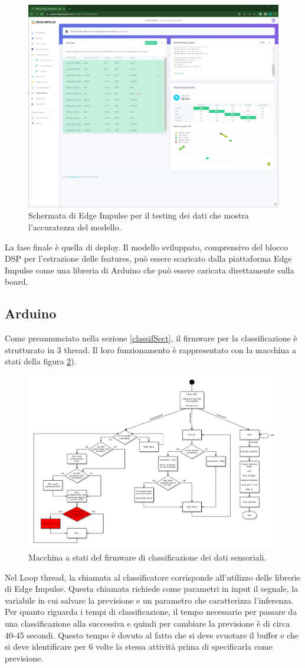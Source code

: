 \begin{figure}[h!]
	\centering
	\includegraphics[width=0.5\linewidth]{./ImageFiles/model_test.jpg}
	\caption{Schermata di Edge Impulse per il testing dei dati che mostra l'accuratezza del modello.}
	\label{fig:model_test}
\end{figure}

La fase finale è quella di deploy. Il modello sviluppato, comprensivo del blocco DSP per l'estrazione delle features, può essere scaricato dalla piattaforma Edge Impulse come una libreria di Arduino che può essere caricata direttamente sulla board. 


\subsection{Arduino} \label{arduinoSect}
Come preannunciato nella sezione \ref{classifSect}, il firmware per la classificazione è strutturato in 3 thread. Il loro funzionamento è rappresentato con la macchina a stati della figura \ref{fig:SM_classif}).
\begin{figure}[tbh]
	\centering
	\includegraphics[width=0.8\linewidth]{./ImageFiles/SM_classification}
	\caption{Macchina a stati del firmware di classificazione dei dati sensoriali.}
	\label{fig:SM_classif}
\end{figure}
Nel Loop thread, la chiamata al classificatore corrisponde all'utilizzo delle librerie di Edge Impulse. Questa chiamata richiede come parametri in input il segnale, la variabile in cui salvare la previsione e un parametro che caratterizza l'inferenza.
Per quanto riguarda i tempi di classificazione, il tempo necessario per passare da una classificazione alla successiva e quindi per cambiare la previsione è di circa 40-45 secondi. Questo tempo è dovuto al fatto che si deve svuotare il buffer e che si deve identificare per 6 volte la stessa attività prima di specificarla come previsione.